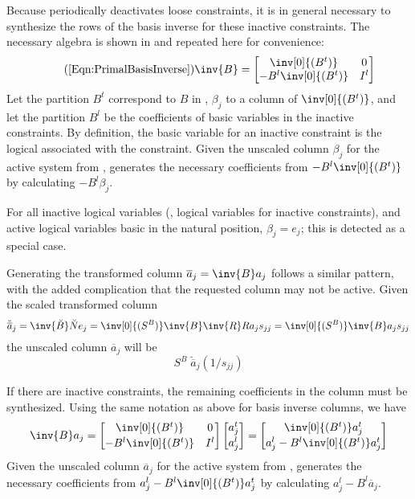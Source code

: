 Because \dylp periodically deactivates loose constraints, it is in general
necessary to synthesize the rows of the basis inverse for these
inactive constraints.
The necessary algebra is shown in  and repeated
here for convenience:
\begin{equation} \tag{\ref{Eqn:PrimalBasisInverse}}
\inv{B} = \begin{bmatrix}
	     \inv[0]{(B^t)} & 0 \\
	     -B^l\inv[0]{(B^t)} & I^l
	  \end{bmatrix}
\end{equation}
Let the partition $B^t$ correspond to $B$ in ,
$\beta_j$ to a column of $\inv[0]{(B^t)}$, and let the
partition $B^l$ be the coefficients of basic variables in the inactive
constraints.
By definition, the basic variable for an inactive constraint is the logical
associated with the constraint.
Given the unscaled column $\beta_j$ for the active system
from ,
\dylp generates the necessary
coefficients from $-B^l\inv[0]{(B^t)}$ by calculating $-B^l\beta_j$.

For all inactive logical variables (\ie, logical variables for inactive
constraints), and active logical variables basic in the natural position,
$\beta_j = e_j$; this is detected as a special case.

Generating the transformed column $\overline{a}_j = \inv{B}a_j$ follows a
similar pattern, with the added complication that the requested column
may not be active.
Given the scaled transformed column
\begin{equation*}
\breve{\overline{a}}_j = \inv{\breve{B}}\breve{N}e_j =
  \inv[0]{(S^B)}\inv{B}\inv{R} R a_j s_{jj} =
  \inv[0]{(S^B)}\inv{B}  a_j s_{jj}
\end{equation*}
the unscaled column $\overline{a}_j$ will be
\begin{equation} \label{eqn:unscaledAbarj}
S^B \; \breve{\overline{a}}_j (1/s_{jj})
\end{equation}

If there are inactive constraints, the remaining coefficients in the column
must be synthesized.
Using the same notation as above for basis inverse columns, we have
\begin{equation*}
\inv{B} a_j = \begin{bmatrix}
	     \inv[0]{(B^t)} & 0 \\[.4ex]
	     -B^l\inv[0]{(B^t)} & I^l
	  \end{bmatrix}
	  \begin{bmatrix} a^t_j \\[.4ex] a^l_j \end{bmatrix}
        = \begin{bmatrix}
	     \inv[0]{(B^t)} a^t_j \\[.4ex]
	     a^l_j - B^l\inv[0]{(B^t)} a^t_j
	  \end{bmatrix}
\end{equation*}
Given the unscaled column $\overline{a}_j$ for the active system
from ,
\dylp generates the necessary
coefficients from $a^l_j - B^l\inv[0]{(B^t)} a^t_j$ by calculating
$a^l_j - B^l\overline{a}_j$.

